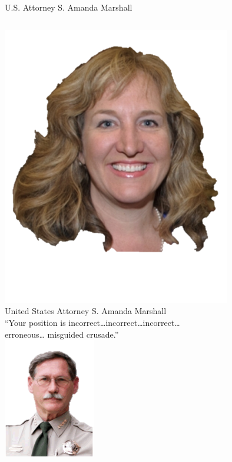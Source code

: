 \begin{frame}{U.S. Attorney S. Amanda Marshall}
    \begin{columns}[onlytextwidth]
            \centering
            \includegraphics[width=0.75\textwidth]{img/amanda-marshall.png} \\
            United States Attorney S. Amanda Marshall \\

            \centering
            ``Your position is incorrect\ldots incorrect\ldots incorrect\ldots \\ erroneous\ldots {} misguided crusade.'' \\
            \includegraphics[width=0.3\textwidth]{img/gil-gilbertson.png} \\
    \end{columns}
\end{frame}

